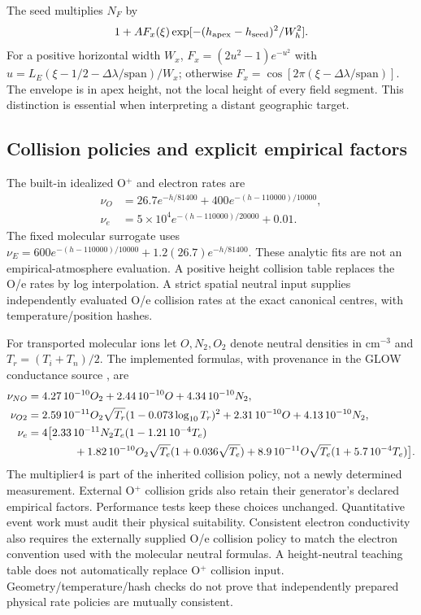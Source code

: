 The seed multiplies $N_F$ by
\begin{equation}
 1+A F_x(\xi)\exp[-(h_{\rm apex}-h_{\rm seed})^2/W_h^2].
\end{equation}
For a positive horizontal width $W_x$,
$F_x=(2u^2-1)e^{-u^2}$ with
$u=L_E(\xi-1/2-\Delta\lambda/\mathrm{span})/W_x$;
otherwise $F_x=\cos[2\pi(\xi-\Delta\lambda/\mathrm{span})]$.
The envelope is in apex height, not the local height of every field segment.
This distinction is essential when interpreting a distant geographic target.

\subsection{Collision policies and explicit empirical factors}
The built-in idealized O$^+$ and electron rates are
\begin{align}
 \nu_O&=26.7e^{-h/81400}+400e^{-(h-110000)/10000},\\
 \nu_e&=5\times10^4e^{-(h-110000)/20000}+0.01.
\end{align}
The fixed molecular surrogate uses
$\nu_E=600e^{-(h-110000)/10000}+1.2(26.7)e^{-h/81400}$.
These analytic fits are not an empirical-atmosphere evaluation. A positive
height collision table replaces the O/e rates by log interpolation. A strict
spatial neutral input supplies independently evaluated O/e collision rates
at the exact canonical centres, with temperature/position hashes.

For transported molecular ions let $O,N_2,O_2$ denote neutral densities in
$\mathrm{cm^{-3}}$ and $T_r=(T_i+T_n)/2$. The implemented formulas, with
provenance in the GLOW conductance source \citep{GLOW}, are
\begin{align}
 \nu_{NO}&=4.27\,10^{-10}O_2+2.44\,10^{-10}O+4.34\,10^{-10}N_2,\\
 \nu_{O2}&=2.59\,10^{-11}O_2\sqrt{T_r}(1-0.073\log_{10}T_r)^2
          +2.31\,10^{-10}O+4.13\,10^{-10}N_2,\\
 \nu_e&=4\big[2.33\,10^{-11}N_2T_e(1-1.21\,10^{-4}T_e)\nonumber\\
 &\hspace{15mm}+1.82\,10^{-10}O_2\sqrt{T_e}(1+0.036\sqrt{T_e})
 +8.9\,10^{-11}O\sqrt{T_e}(1+5.7\,10^{-4}T_e)\big].
\end{align}
The multiplier4 is part of the inherited collision policy, not a newly
determined measurement. External O$^+$ collision grids also retain their
generator's declared empirical factors. Performance tests keep these choices
unchanged. Quantitative event work must audit their physical suitability.
Consistent electron conductivity also requires the externally supplied O/e
collision policy to match the electron convention used with the molecular
neutral formulas. A height-neutral teaching table does not automatically
replace O$^+$ collision input. Geometry/temperature/hash checks do not prove
that independently prepared physical rate policies are mutually consistent.

